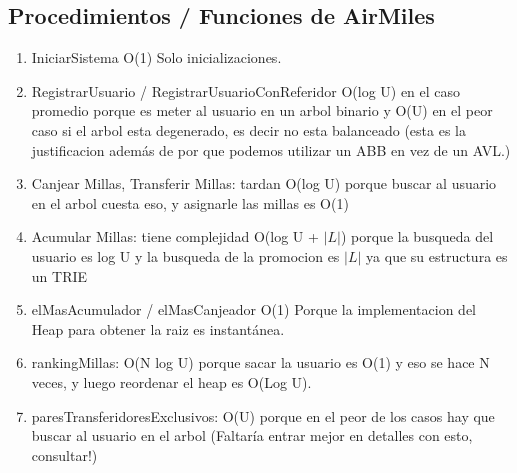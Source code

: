 \documentclass[11pt,a4paper]{article}
\newcommand{\norm}[1]{\vert#1\vert}
\begin{document}
\subsection{Procedimientos / Funciones de AirMiles}
\begin{enumerate}
	\item IniciarSistema O(1) Solo inicializaciones.
	\item RegistrarUsuario / RegistrarUsuarioConReferidor O(log U) en el caso promedio porque es meter al usuario en un arbol binario y O(U) en el peor caso si el arbol esta degenerado, es decir no esta balanceado (esta es la justificacion además de por que podemos utilizar un ABB en vez de un AVL.)
	\item Canjear Millas, Transferir Millas: tardan O(log U) porque buscar al usuario en el arbol cuesta eso, y asignarle las millas es O(1)
	\item Acumular Millas: tiene complejidad O(log U + $\norm{L}$) porque la busqueda del usuario es log U y la busqueda de la promocion es $\norm{L}$ ya que su estructura es un TRIE
	\item elMasAcumulador / elMasCanjeador O(1) Porque la implementacion del Heap para obtener la raiz es instantánea.
	\item rankingMillas: O(N log U) porque sacar la usuario es O(1) y eso se hace N veces, y luego reordenar el heap es O(Log U).
	\item paresTransferidoresExclusivos: O(U) porque en el peor de los casos hay que buscar al usuario en el arbol (Faltaría entrar mejor en detalles con esto, consultar!)

\end{enumerate}
\end{document}
